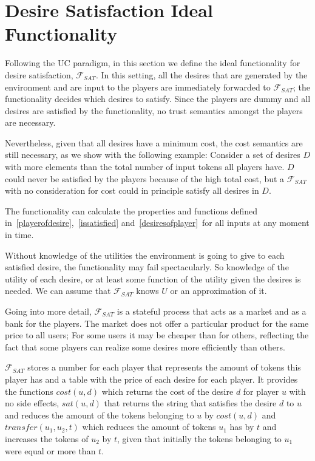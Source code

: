 \section{Desire Satisfaction Ideal Functionality}
  Following the UC paradigm, in this section we define the ideal functionality for desire satisfaction, $\mathcal{F}_{SAT}$.
  In this setting, all the desires that are generated by the environment and are input to the players are immediately forwarded
  to $\mathcal{F}_{SAT}$; the functionality decides which desires to satisfy. Since the players are dummy and all desires are
  satisfied by the functionality, no trust semantics amongst the players are necessary.
  
  Nevertheless, given that all desires have a minimum cost, the cost semantics are still necessary, as we show with the
  following example: Consider a set of desires $D$ with more elements than the total number of input tokens all players have.
  $D$ could never be satisfied by the players because of the high total cost, but a $\mathcal{F}_{SAT}$ with no consideration
  for cost could in principle satisfy all desires in $D$.

  The functionality can calculate the properties and functions defined in~\ref{playerofdesire},~\ref{issatisfied}
  and~\ref{desiresofplayer}\ for all inputs at any moment in time.

  Without knowledge of the utilities the environment is going to give to each satisfied desire, the functionality may fail
  spectacularly. So knowledge of the utility of each desire, or at least some function of the utility given the desires is
  needed. We can assume that $\mathcal{F}_{SAT}$ knows $U$ or an approximation of it.

  Going into more detail, $\mathcal{F}_{SAT}$ is a stateful process that acts as a market and as a bank for the players. The
  market does not offer a particular product for the same price to all users; For some users it may be cheaper than for others,
  reflecting the fact that some players can realize some desires more efficiently than others.

  $\mathcal{F}_{SAT}$ stores a number for each player that represents the amount of tokens this player has and a table with the
  price of each desire for each player. It provides the functions $cost\left(u, d\right)$ which returns the cost of the desire
  $d$ for player $u$ with no side effects, $sat\left(u, d\right)$ that returns the string that satisfies the desire $d$ to $u$
  and reduces the amount of the tokens belonging to $u$ by $cost\left(u, d\right)$ and $transfer\left(u_1, u_2, t\right)$ which
  reduces the amount of tokens $u_1$ has by $t$ and increases the tokens of $u_2$ by $t$, given that initially the tokens
  belonging to $u_1$ were equal or more than $t$.
